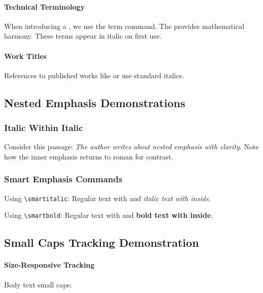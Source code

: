 \documentclass[11pt,a4paper]{article}
\begin{document}
\paragraph{Technical Terminology}
When introducing a , we use the term command. The  provides mathematical harmony. These terms appear in italic on first use.

\paragraph{Work Titles}
References to published works like  or  use standard italics.

\subsection{Nested Emphasis Demonstrations}

\subsubsection{Italic Within Italic}

Consider this passage: \emph{The author writes about \emph{nested emphasis} with clarity}. Note how the inner emphasis returns to roman for contrast.

\subsubsection{Smart Emphasis Commands}

Using \texttt{\textbackslash smartitalic}: Regular text with  and \emph{italic text with  inside}.

Using \texttt{\textbackslash smartbold}: Regular text with  and \textbf{bold text with  inside}.

\subsection{Small Caps Tracking Demonstration}

\paragraph{Size-Responsive Tracking}

Body text small caps: 
\end{document}
